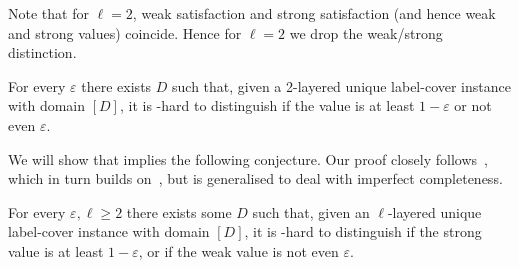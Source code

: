 \documentclass[a4paper,11pt, DIV=11]{scrartcl}
\renewcommand{\epsilon}{\varepsilon}
\theoremstyle{plain}
\theoremstyle{definition}
\begin{document}
Note that for $\ell = 2$, weak satisfaction and strong satisfaction (and hence weak and strong values) coincide. Hence for $\ell = 2$ we drop the weak/strong distinction.

\begin{conjecture}\label{conj:UGC}
For every $\epsilon$ there exists $D$ such that, given a 2-layered unique label-cover instance with domain $[D]$, it is \NP-hard to distinguish if the value is at least $1 - \epsilon$ or not even $\epsilon$.
\end{conjecture}

We will show that  implies the following conjecture. Our proof
closely follows~\cite{BWZ21}, which in turn builds on~\cite{DinurGKR05}, but is generalised to deal with imperfect completeness.

\begin{conjecture}\label{conj:mulUGC}
For every $\epsilon, \ell \geq 2$ there exists some $D$ such that, given an $\ell$-layered unique label-cover instance with domain $[D]$, it is \NP-hard to distinguish if the strong value is at least $1 - \epsilon$, or if the weak value is not even $\epsilon$.
\end{conjecture}
\end{document}
